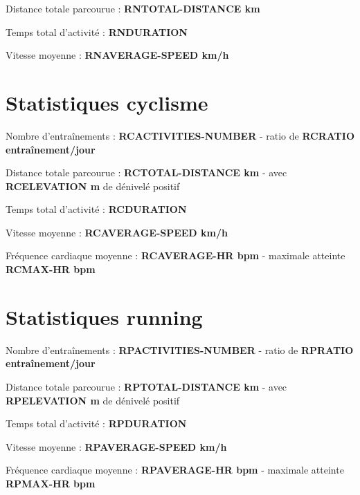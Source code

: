\documentclass[a4paper,french,11pt]{report}
\begin{document}
\textbullet Distance totale parcourue : \textbf{RNTOTAL-DISTANCE km}

\textbullet Temps total d'activité : \textbf{RNDURATION}

\textbullet Vitesse moyenne : \textbf{RNAVERAGE-SPEED km/h}


\section*{Statistiques cyclisme}
\thispagestyle{empty}


\textbullet Nombre d'entraînements : \textbf{RCACTIVITIES-NUMBER} -
ratio de \textbf{RCRATIO entraînement/jour}

\textbullet Distance totale parcourue : \textbf{RCTOTAL-DISTANCE km} -
avec \textbf{RCELEVATION m} de dénivelé positif

\textbullet Temps total d'activité : \textbf{RCDURATION}

\textbullet Vitesse moyenne : \textbf{RCAVERAGE-SPEED km/h}

\textbullet Fréquence cardiaque moyenne : \textbf{RCAVERAGE-HR bpm} -
maximale atteinte \textbf{RCMAX-HR bpm}


\section*{Statistiques running}
\thispagestyle{empty}


\textbullet Nombre d'entraînements : \textbf{RPACTIVITIES-NUMBER} -
ratio de \textbf{RPRATIO entraînement/jour}

\textbullet Distance totale parcourue : \textbf{RPTOTAL-DISTANCE km} -
avec \textbf{RPELEVATION m} de dénivelé positif

\textbullet Temps total d'activité : \textbf{RPDURATION}

\textbullet Vitesse moyenne : \textbf{RPAVERAGE-SPEED km/h}

\textbullet Fréquence cardiaque moyenne : \textbf{RPAVERAGE-HR bpm} -
maximale atteinte \textbf{RPMAX-HR bpm}
\end{document}

